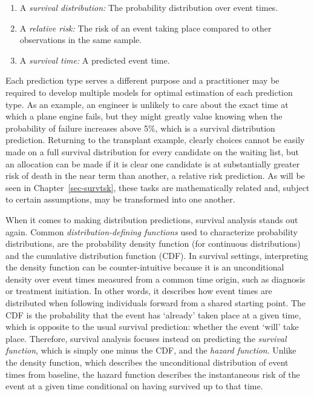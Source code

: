 \documentclass[
  letterpaper,
  krantz2]{style/krantz}
\providecommand{\tightlist}{%
  \setlength{\itemsep}{0pt}\setlength{\parskip}{0pt}}
\begin{document}
\begin{enumerate}
\def\labelenumi{\roman{enumi}.}
\tightlist
\item
  A \emph{survival distribution:} The probability distribution over
  event times.
\item
  A \emph{relative risk:} The risk of an event taking place compared to
  other observations in the same sample.
\item
  A \emph{survival time:} A predicted event time.
\end{enumerate}

Each prediction type serves a different purpose and a practitioner may
be required to develop multiple models for optimal estimation of each
prediction type. As an example, an engineer is unlikely to care about
the exact time at which a plane engine fails, but they might greatly
value knowing when the probability of failure increases above 5\%, which
is a survival distribution prediction. Returning to the transplant
example, clearly choices cannot be easily made on a full survival
distribution for every candidate on the waiting list, but an allocation
can be made if it is clear one candidate is at substantially greater
risk of death in the near term than another, a relative risk prediction.
As will be seen in Chapter~\ref{sec-survtsk}, these tasks are
mathematically related and, subject to certain assumptions, may be
transformed into one another.

When it comes to making distribution predictions, survival analysis
stands out again. Common \emph{distribution-defining
functions} used to characterize
probability distributions, are the probability density
function (for continuous
distributions) and the cumulative distribution
function (CDF). In survival
settings, interpreting the density function can be counter-intuitive
because it is an unconditional density over event times measured from a
common time origin, such as diagnosis or treatment initiation. In other
words, it describes how event times are distributed when following
individuals forward from a shared starting point. The CDF is the
probability that the event has `already' taken place at a given time,
which is opposite to the usual survival prediction: whether the event
`will' take place. Therefore, survival analysis focuses instead on
predicting the \emph{survival function}, which
is simply one minus the CDF, and the \emph{hazard
function}. Unlike the density function, which
describes the unconditional distribution of event times from baseline,
the hazard function describes the instantaneous risk of the event at a
given time conditional on having survived up to that time.
\end{document}
